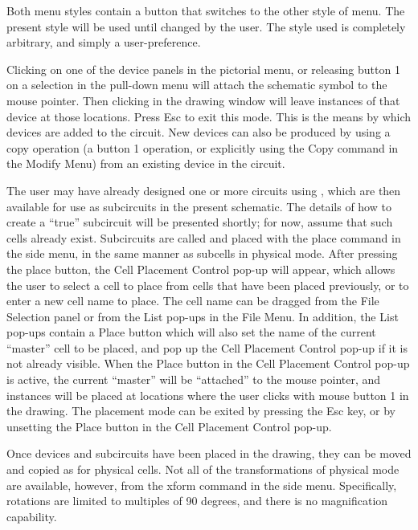 Both menu styles contain a button that switches to the other style of
menu.  The present style will be used until changed by the user.  The
style used is completely arbitrary, and simply a user-preference.

Clicking on one of the device panels in the pictorial menu, or
releasing button 1 on a selection in the pull-down menu will attach
the schematic symbol to the mouse pointer.  Then clicking in the
drawing window will leave instances of that device at those locations. 
Press {\kb Esc} to exit this mode.  This is the means by which devices
are added to the circuit.  New devices can also be produced by using a
copy operation (a button 1 operation, or explicitly using the {\cb
Copy} command in the {\cb Modify Menu}) from an existing device in the
circuit.

The user may have already designed one or more circuits using {\Xic},
which are then available for use as subcircuits in the present
schematic.  The details of how to create a ``true'' subcircuit will be
presented shortly; for now, assume that such cells already exist. 
Subcircuits are called and placed with the {\cb place} command in the
side menu, in the same manner as subcells in physical mode. 
After pressing the {\cb place} button, the {\cb Cell Placement
Control} pop-up will appear, which allows the user to select a cell to
place from cells that have been placed previously, or to enter a new
cell name to place.  The cell name can be dragged from the {\cb File
Selection} panel or from the List pop-ups in the {\cb File Menu}.  In
addition, the {\cb List} pop-ups contain a {\cb Place} button which
will also set the name of the current ``master'' cell to be placed,
and pop up the {\cb Cell Placement Control} pop-up if it is not
already visible.  When the {\cb Place} button in the {\cb Cell
Placement Control} pop-up is active, the current ``master'' will be
``attached'' to the mouse pointer, and instances will be placed at
locations where the user clicks with mouse button 1 in the drawing. 
The placement mode can be exited by pressing the {\kb Esc} key, or by
unsetting the {\cb Place} button in the {\cb Cell Placement Control
pop-up}.

Once devices and subcircuits have been placed in the drawing, they can
be moved and copied as for physical cells.  Not all of the
transformations of physical mode are available, however, from the {\cb
xform} command in the side menu.  Specifically, rotations are limited
to multiples of 90 degrees, and there is no magnification capability.

